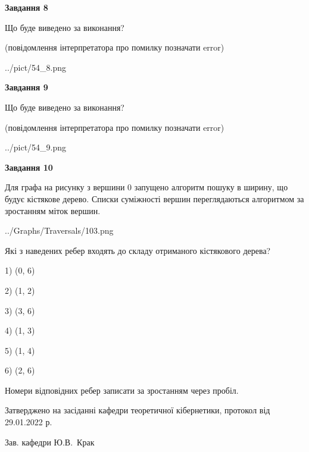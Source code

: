 \documentclass[12pt, ukrainian]{article}
\begin{document}
{\begin {large}
{\begin {center}\textbf{Завдання 8}\end {center}}\par
Що буде виведено за виконання?\par
 (повідомлення інтерпретатора про помилку позначати error)
\begin{center}
	{../pict/54_8.png}
\end{center}
\newpage

{\begin {center}\textbf{Завдання 9}\end {center}}\par
Що буде виведено за виконання?\par
 (повідомлення інтерпретатора про помилку позначати error)\par
\begin{center}
	{../pict/54_9.png}
\end{center}
\newpage

{\begin {center}\textbf{Завдання 10}\end {center}}\par
Для графа на рисунку з вершини 0 запущено алгоритм пошуку в ширину, що будує кістякове дерево. Списки суміжності вершин переглядаються алгоритмом за зростанням міток вершин.\par
\begin{center}
	{../Graphs/Traversals/103.png}
\end{center}
\par Які з наведених ребер входять до складу отриманого кістякового дерева?\par
1) (0, 6)\par
2) (1, 2)\par
3) (3, 6)\par
4) (1, 3)\par
5) (1, 4)\par
6) (2, 6)\par
{\vskip 15pt} Номери відповідних ребер записати за зростанням через пробіл.\par
\newpage


\end {large}
}
{\smallskip \begin {small} Затверджено на засіданні кафедри теоретичної кібернетики, протокол  від   29.01.2022 р.\par\smallskip\smallskip
{\parbox {6.5 cm}{Зав. кафедри \dotfill Ю.В.~Крак}} \end{small}}
\end{document}

